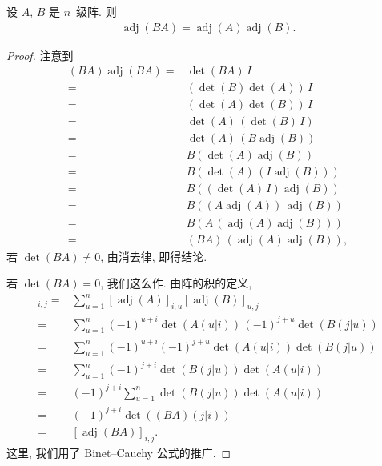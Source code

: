 \begin{theorem}
    设 \(A\), \(B\) 是 \(n\)~级阵.
    则
    \begin{align*}
        \operatorname{adj} {(BA)}
        = \operatorname{adj} {(A)} \operatorname{adj} {(B)}.
    \end{align*}
\end{theorem}

\begin{proof}
    注意到
    \begin{align*}
        (BA) \operatorname{adj} {(BA)}
        = {} &
        \det {(BA)}\, I
        \\
        = {} &
        (\det {(B)} \det {(A)})\, I
        \\
        = {} &
        (\det {(A)} \det {(B)})\, I
        \\
        = {} &
        \det {(A)}\, (\det {(B)}\, I)
        \\
        = {} &
        \det {(A)}\, (B \operatorname{adj} {(B)})
        \\
        = {} &
        B (\det {(A)} \operatorname{adj} {(B)})
        \\
        = {} &
        B (\det {(A)}\, (I \operatorname{adj} {(B)}))
        \\
        = {} &
        B ((\det {(A)}\, I) \operatorname{adj} {(B)})
        \\
        = {} &
        B ((A \operatorname{adj} {(A)})\, \operatorname{adj} {(B)})
        \\
        = {} &
        B (A\, (\operatorname{adj} {(A)} \operatorname{adj} {(B)}))
        \\
        = {} &
        (B A)\, (\operatorname{adj} {(A)} \operatorname{adj} {(B)}),
    \end{align*}
    若 \(\det {(BA)} \neq 0\),
    由消去律, 即得结论.

    若 \(\det {(BA)} = 0\), 我们这么作.
    由阵的积的定义,
    \begin{align*}
        [\operatorname{adj} {(A)} \operatorname{adj} {(B)}]_{i,j}
        = {} &
        \sum_{u = 1}^{n}
        {[\operatorname{adj} {(A)}]_{i,u}
            [\operatorname{adj} {(B)}]_{u,j}}
        \\
        = {} &
        \sum_{u = 1}^{n}
        {(-1)^{u+i} \det {(A(u|i))}\,
        (-1)^{j+u} \det {(B(j|u))}}
        \\
        = {} &
        \sum_{u = 1}^{n}
        {(-1)^{u+i} (-1)^{j+u}
        \det {(A(u|i))} \det {(B(j|u))}}
        \\
        = {} &
        \sum_{u = 1}^{n}
        {(-1)^{j+i} \det {(B(j|u))} \det {(A(u|i))}}
        \\
        = {} &
        (-1)^{j+i}
        \sum_{u = 1}^{n}
        {\det {(B(j|u))} \det {(A(u|i))}}
        \\
        = {} &
        (-1)^{j+i}
        \det {((BA)(j|i))}
        \\
        = {} &
        [\operatorname{adj} {(BA)}]_{i,j}.
    \end{align*}
    这里, 我们用了 Binet--Cauchy 公式的推广.
\end{proof}

